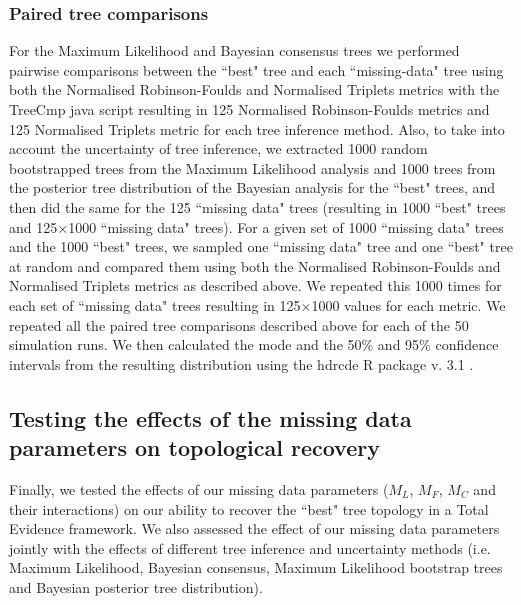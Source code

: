 \documentclass[12pt,letterpaper]{article}
\begin{document}
\subsubsection{Paired tree comparisons}
\label{tree_comparisons}
For the Maximum Likelihood and Bayesian consensus trees we performed pairwise comparisons between the ``best" tree and each ``missing-data" tree using both the Normalised Robinson-Foulds and Normalised Triplets metrics with the TreeCmp java script \citep{Bogdanowicz2012} resulting in 125 Normalised Robinson-Foulds metrics and 125 Normalised Triplets metric for each tree inference method.
Also, to take into account the uncertainty of tree inference, we extracted 1000 random bootstrapped trees from the Maximum Likelihood analysis and 1000 trees from the posterior tree distribution of the Bayesian analysis for the ``best" trees, and then did the same for the 125 ``missing data" trees (resulting in 1000 ``best" trees and 125$\times$1000 ``missing data" trees). 
For a given set of 1000 ``missing data" trees and the 1000 ``best" trees, we sampled one ``missing data" tree and one ``best" tree at random and compared them using both the Normalised Robinson-Foulds and Normalised Triplets metrics as described above.
We repeated this 1000 times for each set of ``missing data" trees resulting in 125$\times$1000 values for each metric.
We repeated all the paired tree comparisons described above for each of the 50 simulation runs.
We then calculated the mode and the 50\% and 95\% confidence intervals from the resulting distribution using the hdrcde R package v. 3.1 \citep{hdrcde}.

\subsection{Testing the effects of the missing data parameters on topological recovery}
Finally, we tested the effects of our missing data parameters ($M_{L}$, $M_{F}$, $M_{C}$ and their interactions) on our ability to recover the ``best" tree topology in a Total Evidence framework.
We also assessed the effect of our missing data parameters jointly with the effects of different tree inference and uncertainty methods (i.e. Maximum Likelihood, Bayesian consensus, Maximum Likelihood bootstrap trees and Bayesian posterior tree distribution).
\end{document}
